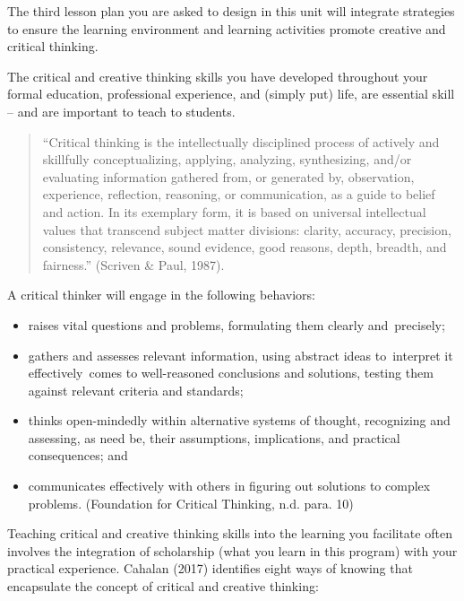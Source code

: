 \documentclass[
]{book}
\providecommand{\tightlist}{%
  \setlength{\itemsep}{0pt}\setlength{\parskip}{0pt}}
\begin{document}
The third lesson plan you are asked to design in this unit will integrate strategies to ensure the learning environment and learning activities promote creative and critical thinking.

The critical and creative thinking skills you have developed throughout your formal education, professional experience, and (simply put) life, are essential skill -- and are important to teach to students.

\begin{quote}
``Critical thinking is the intellectually disciplined process of actively and skillfully conceptualizing, applying, analyzing, synthesizing, and/or evaluating information gathered from, or generated by, observation, experience, reflection, reasoning, or communication, as a guide to belief and action. In its exemplary form, it is based on universal intellectual values that transcend subject matter divisions: clarity, accuracy, precision, consistency, relevance, sound evidence, good reasons, depth, breadth, and fairness.'' (Scriven \& Paul, 1987).
\end{quote}

A critical thinker will engage in the following behaviors:

\begin{itemize}
\tightlist
\item
  raises vital questions and problems, formulating them clearly and~precisely;\\
\item
  gathers and assesses relevant information, using abstract ideas to~interpret it effectively~comes to well-reasoned conclusions and solutions, testing them against relevant criteria and standards;\\
\item
  thinks open-mindedly within alternative systems of thought, recognizing and assessing, as need be, their assumptions, implications, and practical consequences; and\\
\item
  communicates effectively with others in figuring out solutions to complex problems. (Foundation for Critical Thinking, n.d. para. 10)
\end{itemize}

Teaching critical and creative thinking skills into the learning you facilitate often involves the integration of scholarship (what you learn in this program) with your practical experience. Cahalan (2017) identifies eight ways of knowing that encapsulate the concept of critical and creative thinking:
\end{document}
